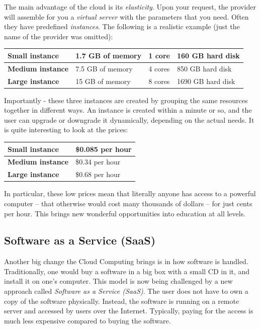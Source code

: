 \documentclass[article,A4,12pt]{llncs}
\begin{document}
The main advantage of the cloud is its {\em elasticity}. Upon your request, the
provider will assemble for you a {\em virtual server} with the parameters that 
you need. Often they have predefined {\em instances}. The following is a realistic 
example (just the name of the provider was omitted):\\

\begin{center}
\begin{tabular}{|l|l|l|l|}
\hline
{\bf Small instance} & 1.7 GB of memory & 1 core & 160 GB hard disk \\
\hline
{\bf Medium instance} & 7.5 GB of memory & 4 cores & 850 GB hard disk \\
\hline
{\bf Large instance} & 15 GB of memory & 8 cores & 1690 GB hard disk \\
\hline
\end{tabular}
\end{center}

\vspace{4mm}
\noindent
Importantly - these three instances are created by grouping the same resources together 
in different ways. An instance is created within a minute or so,
and the user can upgrade or downgrade it dynamically, depending on the actual needs.
It is quite interesting to look at the prices:

\begin{center}
\begin{tabular}{|l|l|}
\hline
{\bf Small instance} &	\$0.085 per hour\\
\hline
{\bf Medium instance}&	\$0.34 per hour	\\
\hline
{\bf Large instance}&	\$0.68 per hour\\
\hline
\end{tabular}
\end{center}

\vspace{4mm}
\noindent
In particular, these low prices mean that literally anyone has access to 
a powerful computer -- that otherwise would cost many thousands of dollars -- 
for just cents per hour. This brings new wonderful opportunities into 
education at all levels.

\subsection{Software as a Service (SaaS)}

Another big change the Cloud Computing brings is in how software is handled. 
Traditionally, one would buy a software in a big box with a small CD in it, 
and install it on one's computer. This model is now being challenged by a new 
approach called {\em Software as a Service (SaaS)}. The user does not have 
to own a copy of the software physically. Instead, the software is running 
on a remote server and accessed by users over the Internet. Typically, paying 
for the access is much less expensive compared to buying the software.
\end{document}
